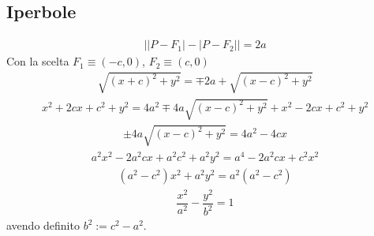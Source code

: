 \documentclass[letterpaper,10pt,english]{jupyterBook}
\begin{document}
\subsection{Iperbole}
\label{\detokenize{ch/analytic_geometry/analytic_geometry_2d/conics-cartesian:iperbole}}\begin{equation*}
\begin{split}\big| |P - F_1| - |P - F_2| \big| = 2a\end{split}
\end{equation*}
\sphinxAtStartPar
Con la scelta \(F_1 \equiv (-c,0)\), \(F_2 \equiv (c,0)\)
\begin{equation*}
\begin{split}\sqrt{(x+c)^2 + y^2} = \mp 2a + \sqrt{(x-c)^2 + y^2}\end{split}
\end{equation*}\begin{equation*}
\begin{split}x^2 + 2 c x + c^2 + y^2 = 4 a^2 \mp 4a \sqrt{(x-c)^2 + y^2} + x^2 - 2 c x + c^2 + y^2\end{split}
\end{equation*}\begin{equation*}
\begin{split}\pm 4a \sqrt{(x-c)^2 + y^2} = 4 a^2 - 4 c x\end{split}
\end{equation*}\begin{equation*}
\begin{split}a^2 x^2-2 a^2 c x + a^2 c^2 + a^2 y^2 = a^4 - 2 a^2 c x + c^2 x^2\end{split}
\end{equation*}\begin{equation*}
\begin{split}(a^2 - c^2)x^2 + a^2 y^2 = a^2 ( a^2 - c^2 )\end{split}
\end{equation*}\begin{equation*}
\begin{split}\dfrac{x^2}{a^2} - \dfrac{y^2}{b^2} = 1\end{split}
\end{equation*}
\sphinxAtStartPar
avendo definito \(b^2 := c^2 - a^2\).

\sphinxstepscope
\end{document}
